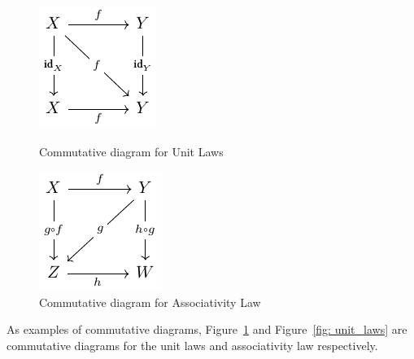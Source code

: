 \documentclass[12pt,a4paper]{report}
\theoremstyle{definition}
\begin{document}
            \begin{figure}[H]
                \centering
                \begin{minipage}{0.3\linewidth}
                    \centering
                    \includegraphics[width=0.6\linewidth]{unit_laws.pdf}
                    \caption{Commutative diagram for Unit Laws}
                    \label{fig: unit_laws}
                \end{minipage} \hspace{0.1\linewidth}
                \begin{minipage}{0.3\linewidth}
                    \centering
                    \includegraphics[width=0.6\linewidth]{associativity_law.pdf}
                    \caption{Commutative diagram for Associativity Law}
                    \label{fig: associativity_law}
                \end{minipage}
            \end{figure}

            As examples of commutative diagrams, Figure~\ref{fig: associativity_law} and Figure~\ref{fig: unit_laws} are commutative diagrams for the unit laws and associativity law respectively. 
\end{document}
